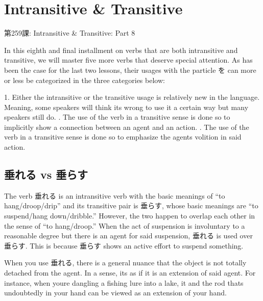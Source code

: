     
\chapter{Intransitive \& Transitive}

\begin{center}
\begin{Large}
第259課: Intransitive \& Transitive: Part 8 
\end{Large}
\end{center}
 
\par{ In this eighth and final installment on verbs that are both intransitive and transitive, we will master five more verbs that deserve special attention. As has been the case for the last two lessons, their usages with the particle を can more or less be categorized in the three categories below: }

\par{1. Either the intransitive or the transitive usage is relatively new in the language. Meaning, some speakers will think it\textquotesingle s wrong to use it a certain way but many speakers still do. \hfill{}. The use of the verb in a transitive sense is done so to implicitly show a connection between an agent and an action. \hfill{}. The use of the verb in a transitive sense is done so to emphasize the agent\textquotesingle s volition in said action. }
      
\section{垂れる vs 垂らす}
 
\par{ The verb 垂れる is an intransitive verb with the basic meanings of “to hang\slash droop\slash drip” and its transitive pair is 垂らす, whose basic meanings are “to suspend\slash hang down\slash dribble.” However, the two happen to overlap each other in the sense of “to hang\slash droop.” When the act of suspension is involuntary to a reasonable degree but there is an agent for said suspension, 垂れる is used over 垂らす. This is because \emph{ }垂らす shows an active effort to suspend something. }

\par{ When you use \emph{ }垂れる, there is a general nuance that the object is not totally detached from the agent. In a sense, it\textquotesingle s as if it is an extension of said agent. For instance, when you\textquotesingle re dangling a fishing lure into a lake, it and the rod that\textquotesingle s undoubtedly in your hand can be viewed as an extension of your hand. }

